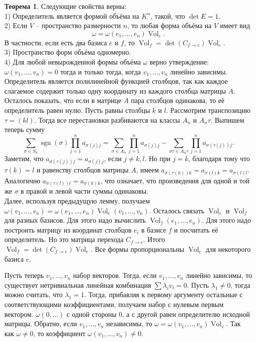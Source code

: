 \documentclass[10pt,a4paper,oneside]{book}
\theoremstyle{definition}
\newtheorem{thm}{\color{red!40!black}Теорема}
\newcommand{\Vol}{\operatorname{Vol}}
\newcommand{\sgn}{\operatorname{sgn}}
\begin{document}
\begin{thm} Следующие свойства верны:\\
1) Определитель является формой объёма на $K^n$, такой, что $\det E=1$.\\
2) Если $V$ -- пространство размерности $n$, то любая форма объёма на $V$ имеет вид $$\omega=\omega(e_1,\dots,e_n)\Vol_e.$$
В частности, если есть два базиса $e$ и $f$, то $\Vol_{f}=\det(C_{f \to e}) \Vol_{e}$.\\
3) Пространство форм объёма одномерно.\\
4) Для любой невырожденной формы объёма $\omega$ верно утверждение: $\omega(v_1,\dots,v_n)=0$ тогда и только тогда, когда $v_1,\dots,v_n$ линейно зависимы.
\proof Определитель является полилинейной функцией столбцов, так как  каждое слагаемое содержит только одну координату из каждого столбца матрицы $A$. Осталось показать, что если в матрице $A$ пара столбцов одинакова, то её определитель равен нулю.
Пусть равны столбцы $k$ и $l$. Рассмотрим транспозицию $\tau=(kl)$. Тогда все перестановки разбиваются на классы $A_n$ и $A_n\tau$. Выпишем теперь сумму
$$\sum_{\sigma \in S_n} \sgn(\sigma)\prod_{j=1}^n a_{\sigma(j)j} = \sum_{\sigma \in A_n} \prod_{j=1}^n a_{\sigma(j)j}- \sum_{\sigma\tau \in A_n\tau} \prod_{j=1}^n a_{\sigma(\tau(j))j}.$$
Заметим, что $a_{\sigma(\tau(j))j}=a_{\sigma(j)j}$, если $j\neq k,l$. Но при  $j=k$, благодаря тому что $\tau(k)=l$  и равенству столбцов матрицы $A$, имеем $a_{\sigma(\tau(k))k}=a_{\sigma(l)k}=a_{\sigma(l)l}$. Аналогично $a_{\sigma(\tau(l))l}=a_{\sigma(k)k}$, что означает, что произведения для одной и той же $\sigma$ в правой и левой части суммы одинаковы.\\

Далее, используя предыдущую лемму, получаем $\omega(v_1,\dots,v_n)=\omega(e_1,\dots,e_n)\Vol_e(v_1,\dots,v_n)$. Осталось связать $\Vol_e$ и $\Vol_f$ для разных базисов. Для этого надо вычислить $\Vol_f(e_1,\dots,e_n)$. Для этого надо построить матрицу из координат столбцов $e_i$ в базисе $f$ и посчитать её определитель. Но это матрица перехода $C_{f\to e}$. Итого $\Vol_{f}=\det(C_{f\to e}) \Vol_{e}$. Все формы пропорциональны $\Vol_e$ для некоторого базиса $e$.


Пусть теперь $v_1,\dots,v_n$ набор векторов. Тогда, если $v_1,\dots,v_n$ линейно зависимы, то существует нетривиальная линейная комбинация $\sum \lambda_i v_i=0$. Пусть $\lambda_1\neq 0$, тогда можно считать, что $\lambda_1=1$. Тогда, прибавляя к первому аргументу остальные с соответствующими коэффициентами, получаем набор с нулевым первым вектором. $\omega(0,\dots)$ с одной стороны 0, а с другой равен определителю исходной матрицы.
Обратно, если $v_1,\dots,v_n$ независимы, то $\omega=\omega(v_1,\dots,v_n)\Vol_v$. Так как $\omega \neq 0$, то коэффициент $\omega(v_1, \dots,v_n)\neq 0$.
\endproof
\end{thm}
\end{document}
